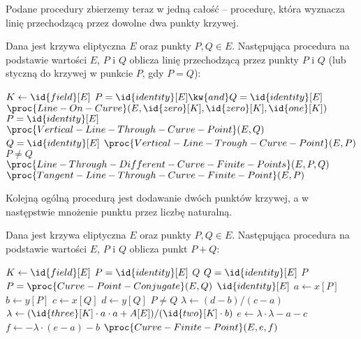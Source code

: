 \noindent
Podane procedury zbierzemy teraz w jedną całość --
procedurę, która wyznacza linię przechodzącą przez dowolne dwa punkty krzywej.

\begin{algorithm}
Dana jest krzywa eliptyczna $E$
oraz punkty $P, Q \in E$.
Następująca procedura
na podstawie wartości $E$, $P$ i $Q$
oblicza
linię przechodzącą przez punkty $P$ i $Q$
(lub styczną do krzywej w punkcie $P$, gdy $P = Q$):

\begin{codebox}
\li
    $K \gets \id{field}[E]$
\li
    \If $P = \id{identity}[E] \kw{ and } Q = \id{identity}[E]$
\li
        \Then
            \Return $\proc{Line-On-Curve}(E, \id{zero}[K], \id{zero}[K], \id{one}[K])$
        \End
\li
    \If $P = \id{identity}[E]$
\li
        \Then
            \Return $\proc{Vertical-Line-Through-Curve-Point}(E, Q)$
        \End
\li
    \If $Q = \id{identity}[E]$
\li
        \Then
            \Return $\proc{Vertical-Line-Trough-Curve-Point}(E, P)$
        \End
\li
    \If $P \neq Q$
\li
        \Then
            \Return $\proc{Line-Through-Different-Curve-Finite-Points}(E, P, Q)$
\li
        \Else
            \Return $\proc{Tangent-Line-Through-Curve-Finite-Point}(E, P)$
        \End
\end{codebox}
\end{algorithm}

\noindent
Kolejną ogólną procedurą jest dodawanie dwóch punktów krzywej,
a w następstwie mnożenie punktu przez liczbę naturalną.

\begin{algorithm}
Dana jest krzywa eliptyczna $E$
oraz punkty $P, Q \in E$.
Następująca procedura
na podstawie wartości $E$, $P$ i $Q$
oblicza
punkt $P + Q$:

\begin{codebox}
\li
    $K \gets \id{field}[E]$
\li
    \If $P = \id{identity}[E]$
\li
        \Then
            \Return $Q$
        \End
\li
    \If $Q = \id{identity}[E]$
\li
        \Then
            \Return $P$
        \End
\li
    \If $P = \proc{Curve-Point-Conjugate}(E, Q)$
\li
        \Then
            \Return $\id{identity}[E]$
        \End
\li
    $a \gets x[P]$
\li
    $b \gets y[P]$
\li
    $c \gets x[Q]$
\li
    $d \gets y[Q]$
\li
    \If $P \neq Q$
\li
        \Then
            $\lambda \gets (d - b)/(c - a)$
\li
        \Else
            $\lambda \gets (\id{three}[K]\cdot a\cdot a + A[E])/(\id{two}[K]\cdot b)$
        \End
\li
    $e \gets \lambda\cdot\lambda - a - c$
\li
    $f \gets -\lambda\cdot(e - a) - b$
\li
    \Return $\proc{Curve-Finite-Point}(E, e, f)$
\end{codebox}
\end{algorithm}

